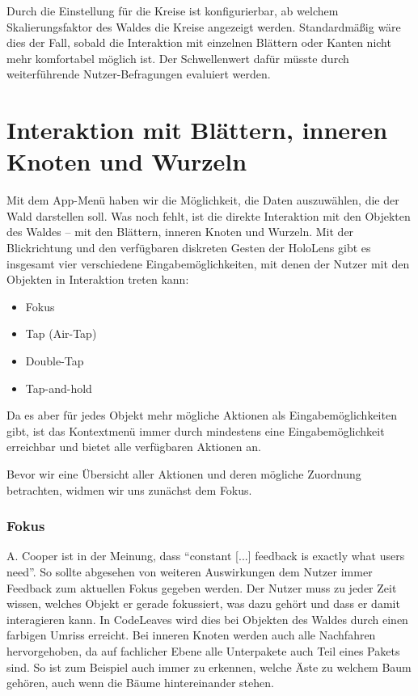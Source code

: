 Durch die Einstellung für die Kreise ist konfigurierbar, ab welchem Skalierungsfaktor des Waldes die Kreise angezeigt werden. Standardmäßig wäre dies der Fall, sobald die Interaktion mit einzelnen Blättern oder Kanten nicht mehr komfortabel möglich ist. Der Schwellenwert dafür müsste durch weiterführende Nutzer-Befragungen evaluiert werden.

\section{Interaktion mit Blättern, inneren Knoten und Wurzeln}
\label{sec:object-interaction}

Mit dem App-Menü haben wir die Möglichkeit, die Daten auszuwählen, die der Wald darstellen soll. Was noch fehlt, ist die direkte Interaktion mit den Objekten des Waldes -- mit den Blättern, inneren Knoten und Wurzeln. Mit der Blickrichtung und den verfügbaren diskreten Gesten der HoloLens gibt es insgesamt vier verschiedene Eingabemöglichkeiten, mit denen der Nutzer mit den Objekten in Interaktion treten kann:

\begin{itemize}
  \item Fokus
  \item Tap (Air-Tap)
  \item Double-Tap
  \item Tap-and-hold
\end{itemize}

Da es aber für jedes Objekt mehr mögliche Aktionen als Eingabemöglichkeiten gibt, ist das Kontextmenü immer durch mindestens eine Eingabemöglichkeit erreichbar und bietet alle verfügbaren Aktionen an.

Bevor wir eine Übersicht aller Aktionen und deren mögliche Zuordnung betrachten, widmen wir uns zunächst dem Fokus.

\subsubsection*{Fokus}

A. Cooper ist in \cite{cooper2014face} der Meinung, dass ``constant [...] feedback is exactly what users need''. So sollte abgesehen von weiteren Auswirkungen dem Nutzer immer Feedback zum aktuellen Fokus gegeben werden. Der Nutzer muss zu jeder Zeit wissen, welches Objekt er gerade fokussiert, was dazu gehört und dass er damit interagieren kann. In CodeLeaves wird dies bei Objekten des Waldes durch einen farbigen Umriss erreicht. Bei inneren Knoten werden auch alle Nachfahren hervorgehoben, da auf fachlicher Ebene alle Unterpakete auch Teil eines Pakets sind. So ist zum Beispiel auch immer zu erkennen, welche Äste zu welchem Baum gehören, auch wenn die Bäume hintereinander stehen.

